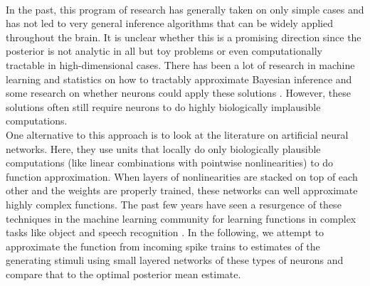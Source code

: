 \documentclass{article} %
\begin{document}
\\
In the past, this program of research has generally taken on only simple cases and has not led to very general inference algorithms that can be widely applied throughout the brain. It is unclear whether this is a promising direction since the posterior is not analytic in all but toy problems or even computationally tractable in high-dimensional cases. There has been a lot of research in machine learning and statistics on how to tractably approximate Bayesian inference \cite{Jordan99anintroduction} \cite{Doucet00onsequential} \cite{AndrieuFDJ03} and some research on whether neurons could apply these solutions \cite{NIPS2009_3782} \cite{NIPS2011_4346} \cite{NIPS2013_4876} \cite{NIPS2002_2152}. However, these solutions often still require neurons to do highly biologically implausible computations. 
\\
One alternative to this approach is to look at the literature on artificial neural networks. Here, they use units that locally do only biologically plausible computations (like linear combinations with pointwise nonlinearities) to do function approximation. When layers of nonlinearities are stacked on top of each other and the weights are properly trained, these networks can well approximate highly complex functions. The past few years have seen a resurgence of these techniques in the machine learning community for learning functions in complex tasks like object and speech recognition \cite{LeCun2015}. In the following, we attempt to approximate the function from incoming spike trains to estimates of the generating stimuli using small layered networks of these types of neurons and compare that to the optimal posterior mean estimate.
\end{document}
